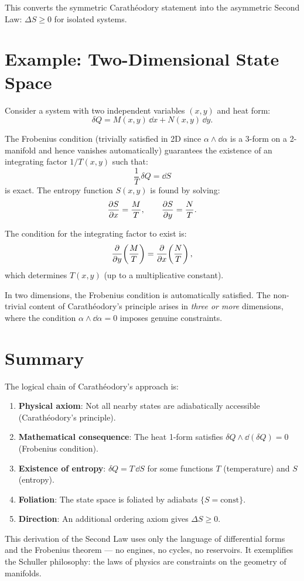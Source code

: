 This converts the symmetric Carath\'eodory statement into the asymmetric Second Law: $\Delta S \geq 0$ for isolated systems.

\section{Example: Two-Dimensional State Space}

Consider a system with two independent variables $(x, y)$ and heat form:
\begin{equation}
\delta Q = M(x,y)\,\dd x + N(x,y)\,\dd y.
\end{equation}

The Frobenius condition (trivially satisfied in 2D since $\alpha \wedge \dd\alpha$ is a 3-form on a 2-manifold and hence vanishes automatically) guarantees the existence of an integrating factor $1/T(x,y)$ such that:
\begin{equation}
\frac{1}{T}\,\delta Q = \dd S
\end{equation}
is exact. The entropy function $S(x,y)$ is found by solving:
\begin{equation}
\pdv{S}{x} = \frac{M}{T}, \qquad \pdv{S}{y} = \frac{N}{T}.
\end{equation}

The condition for the integrating factor to exist is:
\begin{equation}
\pdv{}{y}\!\left(\frac{M}{T}\right) = \pdv{}{x}\!\left(\frac{N}{T}\right),
\end{equation}
which determines $T(x,y)$ (up to a multiplicative constant).

\begin{remark}
In two dimensions, the Frobenius condition is automatically satisfied. The non-trivial content of Carath\'eodory's principle arises in \emph{three or more} dimensions, where the condition $\alpha \wedge \dd\alpha = 0$ imposes genuine constraints.
\end{remark}

\section{Summary}

The logical chain of Carath\'eodory's approach is:

\begin{enumerate}
\item \textbf{Physical axiom}: Not all nearby states are adiabatically accessible (Carath\'eodory's principle).
\item \textbf{Mathematical consequence}: The heat 1-form satisfies $\delta Q \wedge \dd(\delta Q) = 0$ (Frobenius condition).
\item \textbf{Existence of entropy}: $\delta Q = T\,\dd S$ for some functions $T$ (temperature) and $S$ (entropy).
\item \textbf{Foliation}: The state space is foliated by adiabats $\{S = \text{const}\}$.
\item \textbf{Direction}: An additional ordering axiom gives $\Delta S \geq 0$.
\end{enumerate}

This derivation of the Second Law uses only the language of differential forms and the Frobenius theorem --- no engines, no cycles, no reservoirs. It exemplifies the Schuller philosophy: the laws of physics are constraints on the geometry of manifolds.
